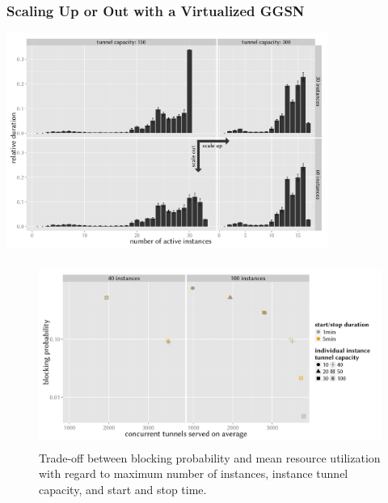 \documentclass{beamer}
\begin{document}
\begin{frame}
	\frametitle{Scaling Up or Out with a Virtualized GGSN}
	
	\begin{center}
		\includegraphics[height=7cm]{../../chapters/04-mobilenets/images/R-virtualized-instanceuse-barplot.pdf}
	\end{center}
\end{frame}

\begin{frame}
	\begin{figure}
		\centering
		\includegraphics[height=6cm]{../../chapters/04-mobilenets/images/R-virtualized-startstop-tunnelusage-blocking-comparison.pdf}
		\caption{Trade-off between blocking probability and mean resource utilization with regard to maximum number of instances, instance tunnel capacity, and start and stop time.}
	\end{figure}
\end{frame}
\end{document}
